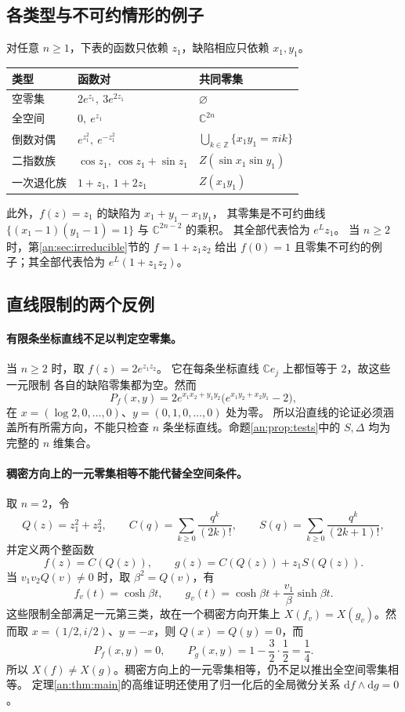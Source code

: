 \documentclass[11pt,a4paper,oneside,openany]{book}
\theoremstyle{lecture}
\newcommand{\C}{\mathbb C}
\newcommand{\Z}{\mathbb Z}
\newcommand{\dd}{\mathrm d}
\newcommand{\e}{e}
\numberwithin{equation}{section}
\begin{document}
\subsection{各类型与不可约情形的例子}
对任意 $n\ge1$，下表的函数只依赖 $z_1$，缺陷相应只依赖 $x_1,y_1$。
\begin{center}
\small
\begin{tabular}{@{}p{}p{}p{}@{}}
\toprule
类型 & 函数对 & 共同零集 \\
\midrule
空零集 & $2e^{z_1},\ 3e^{2z_1}$ & $\varnothing$ \\
全空间 & $0,\ e^{z_1}$ & $\C^{2n}$ \\
倒数对偶 & $e^{z_1^2},\ e^{-z_1^2}$ & $\bigcup_{k\in\Z}\{x_1y_1=\pi i k\}$ \\
二指数族 & $\cos z_1,\ \cos z_1+\sin z_1$ & $Z(\sin x_1\sin y_1)$ \\
一次退化族 & $1+z_1,\ 1+2z_1$ & $Z(x_1y_1)$ \\
\bottomrule
\end{tabular}
\end{center}
此外，$f(z)=z_1$ 的缺陷为 $x_1+y_1-x_1y_1$，
其零集是不可约曲线 $\{(x_1-1)(y_1-1)=1\}$ 与 $\C^{2n-2}$ 的乘积。
其全部代表恰为 $e^Lz_1$。
当 $n\ge2$ 时，第\ref{an:sec:irreducible}节的 $f=1+z_1z_2$
给出 $f(0)=1$ 且零集不可约的例子；其全部代表恰为 $e^L(1+z_1z_2)$。

\subsection{直线限制的两个反例}
\paragraph{有限条坐标直线不足以判定空零集。}
当 $n\geq2$ 时，取 $f(z)=2\e^{z_1z_2}$。
它在每条坐标直线 $\C e_j$ 上都恒等于 $2$，故这些一元限制
各自的缺陷零集都为空。然而
\[
 P_f(x,y)=2\e^{x_1x_2+y_1y_2}
 \bigl(\e^{x_1y_2+x_2y_1}-2\bigr),
\]
在 $x=(\log2,0,\ldots,0)$、$y=(0,1,0,\ldots,0)$ 处为零。
所以沿直线的论证必须涵盖所有所需方向，不能只检查
$n$ 条坐标直线。命题\ref{an:prop:tests}中的 $S,\Delta$
均为完整的 $n$ 维集合。

\paragraph{稠密方向上的一元零集相等不能代替全空间条件。}
取 $n=2$，令
\[
 Q(z)=z_1^2+z_2^2,\qquad
 C(q)=\sum_{k\geq0}\frac{q^k}{(2k)!},\qquad
 S(q)=\sum_{k\geq0}\frac{q^k}{(2k+1)!},
\]
并定义两个整函数
\[
 f(z)=C(Q(z)),\qquad g(z)=C(Q(z))+z_1S(Q(z)).
\]
当 $v_1v_2Q(v)\ne0$ 时，取 $\beta^2=Q(v)$，有
\[
 f_v(t)=\cosh\beta t,\qquad
 g_v(t)=\cosh\beta t+\frac{v_1}{\beta}\sinh\beta t.
\]
这些限制全部满足一元第三类，故在一个稠密方向开集上
$X(f_v)=X(g_v)$。然而取
$x=(1/2,i/2)$、$y=-x$，则 $Q(x)=Q(y)=0$，而
\[
 P_f(x,y)=0,\qquad
 P_g(x,y)=1-\frac32\cdot\frac12=\frac14.
\]
所以 $X(f)\ne X(g)$。稠密方向上的一元零集相等，仍不足以推出全空间零集相等。
定理\ref{an:thm:main}的高维证明还使用了归一化后的全局微分关系
$\dd f\wedge\dd g=0$。
\end{document}
